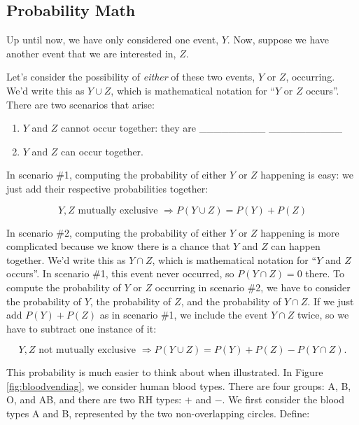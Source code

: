 \documentclass[]{book}
\providecommand{\tightlist}{%
  \setlength{\itemsep}{0pt}\setlength{\parskip}{0pt}}
\theoremstyle{definition}
\theoremstyle{definition}
\theoremstyle{remark}
\begin{document}
\subsection{Probability Math}\label{probability-math}

Up until now, we have only considered one event, \(Y\). Now, suppose we
have another event that we are interested in, \(Z\).

Let's consider the possibility of \emph{either} of these two events,
\(Y\) or \(Z\), occurring. We'd write this as \(Y \cup Z\), which is
mathematical notation for ``\(Y\) or \(Z\) occurs''. There are two
scenarios that arise: \vspace{.1in}

\begin{enumerate}
\def\labelenumi{\arabic{enumi}.}
\tightlist
\item
  \(Y\) and \(Z\) cannot occur together: they are \_\_\_\_\_\_\_\_\_
  \_\_\_\_\_\_\_\_\_\_ \vspace{.1in}
\item
  \(Y\) and \(Z\) can occur together.
\end{enumerate}

In scenario \#1, computing the probability of either \(Y\) or \(Z\)
happening is easy: we just add their respective probabilities together:

\[ Y,Z \text{ mutually exclusive } \Rightarrow P(Y \cup Z) = P(Y) + P(Z)\]

In scenario \#2, computing the probability of either \(Y\) or \(Z\)
happening is more complicated because we know there is a chance that
\(Y\) and \(Z\) can happen together. We'd write this as \(Y \cap Z\),
which is mathematical notation for ``\(Y\) and \(Z\) occurs''. In
scenario \#1, this event never occurred, so \(P(Y \cap Z) = 0\) there.
To compute the probability of \(Y\) or \(Z\) occurring in scenario \#2,
we have to consider the probability of \(Y\), the probability of \(Z\),
and the probability of \(Y \cap Z\). If we just add \(P(Y) + P(Z)\) as
in scenario \#1, we include the event \(Y \cap Z\) twice, so we have to
subtract one instance of it:

\[ Y,Z \text{ not mutually exclusive } \Rightarrow P(Y \cup Z) = P(Y) + P(Z) - P(Y \cap Z).\]

This probability is much easier to think about when illustrated. In
Figure \ref{fig:bloodvendiag}, we consider human blood types. There are
four groups: A, B, O, and AB, and there are two RH types: \(+\) and
\(-\). We first consider the blood types A and B, represented by the two
non-overlapping circles. Define:
\end{document}
